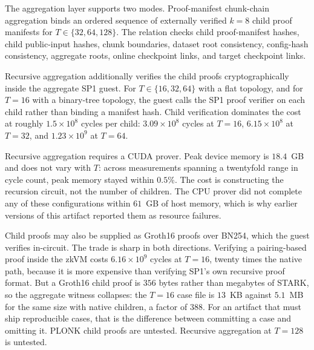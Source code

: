The aggregation layer supports two modes. Proof-manifest chunk-chain
aggregation binds an ordered sequence of externally verified $k=8$ child proof
manifests for $T\in\{32,64,128\}$. The relation checks child proof-manifest
hashes, child public-input hashes, chunk boundaries, dataset root consistency,
config-hash consistency, aggregate roots, online checkpoint links, and target
checkpoint links.

Recursive aggregation additionally verifies the child proofs cryptographically
inside the aggregate SP1 guest. For $T\in\{16,32,64\}$ with a flat topology, and
for $T=16$ with a binary-tree topology, the guest calls the SP1 proof verifier
on each child rather than binding a manifest hash. Child verification dominates
the cost at roughly $1.5\times10^{8}$ cycles per child: $3.09\times10^{8}$ cycles
at $T=16$, $6.15\times10^{8}$ at $T=32$, and $1.23\times10^{9}$ at $T=64$.

Recursive aggregation requires a CUDA prover. Peak device memory is
$18.4$~GB and does not vary with $T$: across measurements spanning a twentyfold
range in cycle count, peak memory stayed within $0.5\%$. The cost is
constructing the recursion circuit, not the number of children. The CPU prover
did not complete any of these configurations within $61$~GB of host memory,
which is why earlier versions of this artifact reported them as resource
failures.

Child proofs may also be supplied as Groth16 proofs over BN254, which the guest
verifies in-circuit. The trade is sharp in both directions. Verifying a
pairing-based proof inside the zkVM costs $6.16\times10^{9}$ cycles at $T=16$,
twenty times the native path, because it is more expensive than verifying SP1's
own recursive proof format. But a Groth16 child proof is $356$ bytes rather than
megabytes of STARK, so the aggregate witness collapses: the $T=16$ case file is
$13$~KB against $5.1$~MB for the same size with native children, a factor of
$388$. For an artifact that must ship reproducible cases, that is the difference
between committing a case and omitting it. PLONK child proofs are untested.
Recursive aggregation at $T=128$ is untested.
